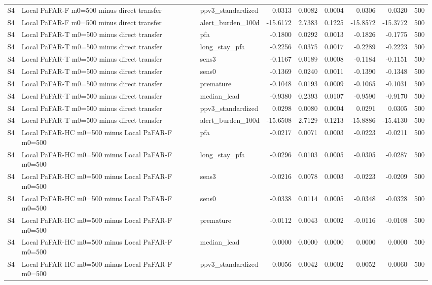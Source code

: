 \begin{table}[tbp]
{\begin{tabular}{lllrrrrrr}
S4 & Local PaFAR-F m0=500 minus direct transfer & ppv3\_standardized & 0.0313 & 0.0082 & 0.0004 & 0.0306 & 0.0320 & 500 \\
S4 & Local PaFAR-F m0=500 minus direct transfer & alert\_burden\_100d & -15.6172 & 2.7383 & 0.1225 & -15.8572 & -15.3772 & 500 \\
S4 & Local PaFAR-T m0=500 minus direct transfer & pfa & -0.1800 & 0.0292 & 0.0013 & -0.1826 & -0.1775 & 500 \\
S4 & Local PaFAR-T m0=500 minus direct transfer & long\_stay\_pfa & -0.2256 & 0.0375 & 0.0017 & -0.2289 & -0.2223 & 500 \\
S4 & Local PaFAR-T m0=500 minus direct transfer & sens3 & -0.1167 & 0.0189 & 0.0008 & -0.1184 & -0.1151 & 500 \\
S4 & Local PaFAR-T m0=500 minus direct transfer & sens0 & -0.1369 & 0.0240 & 0.0011 & -0.1390 & -0.1348 & 500 \\
S4 & Local PaFAR-T m0=500 minus direct transfer & premature & -0.1048 & 0.0193 & 0.0009 & -0.1065 & -0.1031 & 500 \\
S4 & Local PaFAR-T m0=500 minus direct transfer & median\_lead & -0.9380 & 0.2393 & 0.0107 & -0.9590 & -0.9170 & 500 \\
S4 & Local PaFAR-T m0=500 minus direct transfer & ppv3\_standardized & 0.0298 & 0.0080 & 0.0004 & 0.0291 & 0.0305 & 500 \\
S4 & Local PaFAR-T m0=500 minus direct transfer & alert\_burden\_100d & -15.6508 & 2.7129 & 0.1213 & -15.8886 & -15.4130 & 500 \\
S4 & Local PaFAR-HC m0=500 minus Local PaFAR-F m0=500 & pfa & -0.0217 & 0.0071 & 0.0003 & -0.0223 & -0.0211 & 500 \\
S4 & Local PaFAR-HC m0=500 minus Local PaFAR-F m0=500 & long\_stay\_pfa & -0.0296 & 0.0103 & 0.0005 & -0.0305 & -0.0287 & 500 \\
S4 & Local PaFAR-HC m0=500 minus Local PaFAR-F m0=500 & sens3 & -0.0216 & 0.0078 & 0.0003 & -0.0223 & -0.0209 & 500 \\
S4 & Local PaFAR-HC m0=500 minus Local PaFAR-F m0=500 & sens0 & -0.0338 & 0.0114 & 0.0005 & -0.0348 & -0.0328 & 500 \\
S4 & Local PaFAR-HC m0=500 minus Local PaFAR-F m0=500 & premature & -0.0112 & 0.0043 & 0.0002 & -0.0116 & -0.0108 & 500 \\
S4 & Local PaFAR-HC m0=500 minus Local PaFAR-F m0=500 & median\_lead & 0.0000 & 0.0000 & 0.0000 & 0.0000 & 0.0000 & 500 \\
S4 & Local PaFAR-HC m0=500 minus Local PaFAR-F m0=500 & ppv3\_standardized & 0.0056 & 0.0042 & 0.0002 & 0.0052 & 0.0060 & 500 \\

\end{tabular}}
\end{table}
